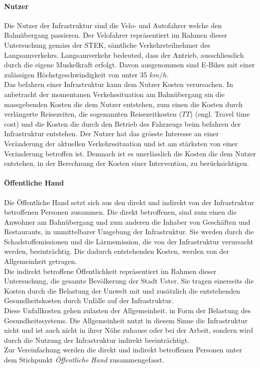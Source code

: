 \paragraph{Nutzer}

Die Nutzer der Infrastruktur sind die Velo- und Autofahrer welche den Bahnübergang passieren. Der Velofahrer repräsentiert im Rahmen dieser Untersuchung gemäss der STEK, sämtliche Verkehrsteilnehmer des Langsamverkehrs. Langsamverkehr bedeuted, dass der Antrieb, ausschliesslich durch die eigene Muskelkraft erfolgt. Davon ausgenommen sind E-Bikes mit einer zulässigen Höchstgeschwindigkeit von unter 35 $km/h$. \\
Das befahren einer Infrastruktur kann dem Nutzer Kosten verursachen. In anbetracht der momentanen Verkehssituation am Bahnübergang sin die massgebenden Kosten die dem Nutzer entstehen, zum einen die Kosten durch verlängerte Reisezeiten, die sogenannten Reisezeitkosten ($TT$) (engl. Travel time cost) und die Kosten die durch den Betrieb des Fahrzeugs beim befahren der Infrastruktur entstehen.  
Der Nutzer hat das grösste Interesse an einer Veränderung der aktuellen Verkehrssituation und ist am stärksten von einer Veränderung betroffen ist. Demnach ist es unerlässlich die Kosten die dem Nutzer entstehen, in der Berechnung der Kosten einer Intervention, zu berücksichtigen.


\paragraph{Öffentliche Hand}

Die Öffentliche Hand setzt sich aus den direkt und indirekt von der Infrastruktur betroffenen Personen zusammen. 
Die direkt betroffenen, sind zum einen die Anwohner am Bahnübergang und zum anderen die Inhaber von Geschäften und Restaurants, in unmittelbarer Umgebung der Infrastruktur. Sie werden durch die Schadstoffemissionen und die Lärmemission, die von der Infrastruktur verursacht werden, beeinträchtig. 
Die dadurch entstehenden Kosten, werden von der Allgemeinheit getragen.\\
Die indirekt betroffene Öffentlichkeit repräsentiert im Rahmen dieser Untersuchung, die gesamte Bevölkerung der Stadt Uster. 
Sie tragen einerseits die Kosten durch die Belastung der Umwelt mit und zusätzlich die entstehenden Gesundheitskosten durch Unfälle auf der Infrastruktur. \\
Diese Unfallkosten gehen zulasten der Allgemeinheit, in Form der Belastung des Gesundheitssystems. Die Allgemeinheit nutzt in diesem Sinne die Infrastruktur nicht und ist auch nicht in ihrer Nähe zuhause oder bei der Arbeit, sondern wird durch die Nutzung der Infrastruktur indirekt beeinträchtigt. \\
Zur Vereinfachung werden die direkt und indirekt betroffenen Personen unter dem Stichpunkt \textit{Öffentliche Hand} zusammengefasst.
 


%

